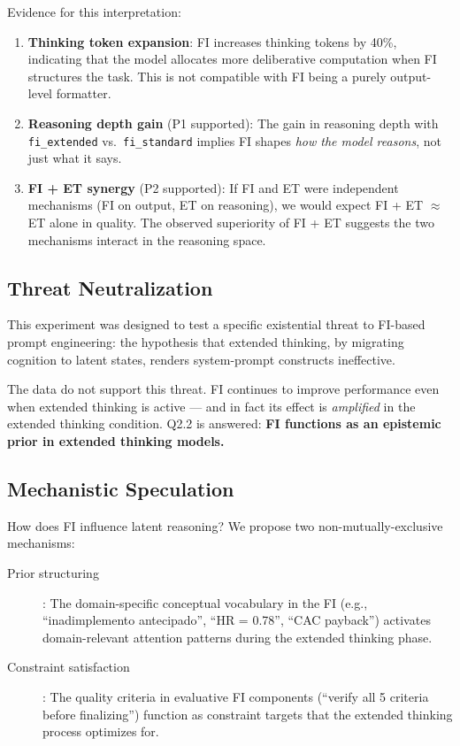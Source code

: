 \documentclass[11pt,a4paper]{article}
\begin{document}
Evidence for this interpretation:
\begin{enumerate}
  \item \textbf{Thinking token expansion}: FI increases thinking tokens by 40\%,
    indicating that the model allocates more deliberative computation when
    FI structures the task. This is not compatible with FI being a purely
    output-level formatter.

  \item \textbf{Reasoning depth gain} (P1 supported): The gain in reasoning depth
    with \texttt{fi\_extended} vs.\ \texttt{fi\_standard} implies FI shapes
    \textit{how the model reasons}, not just what it says.

  \item \textbf{FI + ET synergy} (P2 supported): If FI and ET were independent
    mechanisms (FI on output, ET on reasoning), we would expect FI + ET $\approx$
    ET alone in quality. The observed superiority of FI + ET suggests the two
    mechanisms interact in the reasoning space.
\end{enumerate}

\subsection{Threat Neutralization}

This experiment was designed to test a specific existential threat to FI-based
prompt engineering: the hypothesis that extended thinking, by migrating cognition
to latent states, renders system-prompt constructs ineffective.

The data do not support this threat. FI continues to improve performance even
when extended thinking is active — and in fact its effect is \textit{amplified}
in the extended thinking condition. Q2.2 is answered: \textbf{FI functions as
an epistemic prior in extended thinking models.}

\subsection{Mechanistic Speculation}

How does FI influence latent reasoning? We propose two non-mutually-exclusive
mechanisms:

\begin{description}
  \item[Prior structuring]: The domain-specific conceptual vocabulary in the FI
    (e.g., ``inadimplemento antecipado'', ``HR = 0.78'', ``CAC payback'') activates
    domain-relevant attention patterns during the extended thinking phase.

  \item[Constraint satisfaction]: The quality criteria in evaluative FI components
    (``verify all 5 criteria before finalizing'') function as constraint targets
    that the extended thinking process optimizes for.
\end{description}
\end{document}

